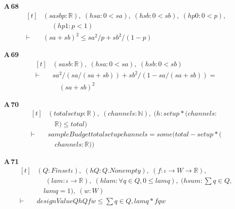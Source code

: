 \noindent\textbf{A\,68}\quad{}
{\footnotesize\[ \begin{aligned}[t]
&(\mathit{sa} \mathit{sb} \mathit{p} : \mathbb{R} ),\; (\mathit{hsa} : 0 < \mathit{sa}),\; (\mathit{hsb} : 0 < \mathit{sb}),\; (\mathit{hp0} : 0 < \mathit{p}),\\
&\quad \; (\mathit{hp1} : \mathit{p} < 1)\\
\vdash\;&(\mathit{sa} + \mathit{sb}) ^{2} \leq \mathit{sa} ^{2} / \mathit{p} + \mathit{sb} ^{2} / (1 - \mathit{p})
\end{aligned} \]}

\noindent\textbf{A\,69}\quad{}
{\footnotesize\[ \begin{aligned}[t]
&(\mathit{sa} \mathit{sb} : \mathbb{R} ),\; (\mathit{hsa} : 0 < \mathit{sa}),\; (\mathit{hsb} : 0 < \mathit{sb})\\
\vdash\;&\mathit{sa} ^{2} / (\mathit{sa} / (\mathit{sa} + \mathit{sb})) + \mathit{sb} ^{2} / (1 - \mathit{sa} / (\mathit{sa} + \mathit{sb})) =\\
&\quad (\mathit{sa} + \mathit{sb}) ^{2}
\end{aligned} \]}

\noindent\textbf{A\,70}\quad{}
{\footnotesize\[ \begin{aligned}[t]
&(\mathit{total} \mathit{setup} : \mathbb{R} ),\; (\mathit{channels} : \mathbb{N} ),\; (\mathit{h} : \mathit{setup} * (\mathit{channels} :\\
&\quad \mathbb{R} ) \leq \mathit{total})\\
\vdash\;&\mathit{sampleBudget} \mathit{total} \mathit{setup} \mathit{channels} = \mathit{some} (\mathit{total} - \mathit{setup} * (\\
&\quad \mathit{channels} : \mathbb{R} ))
\end{aligned} \]}

\noindent\textbf{A\,71}\quad{}
{\footnotesize\[ \begin{aligned}[t]
&(\mathit{Q} : \mathit{Finset} \iota ),\; (\mathit{hQ} : \mathit{Q}.\mathit{Nonempty}),\; (\mathit{f} : \iota \to \mathit{W} \to \mathbb{R} ),\\
&\quad \; (\mathit{lam} : \iota \to \mathbb{R} ),\; (\mathit{hlam} : \forall \mathit{q} \in \mathit{Q}, 0 \leq \mathit{lam} \mathit{q}),\; (\mathit{hsum} : \textstyle\sum \mathit{q} \in \mathit{Q},\\
&\quad \mathit{lam} \mathit{q} = 1),\; (\mathit{w} : \mathit{W})\\
\vdash\;&\mathit{designValue} \mathit{Q} \mathit{hQ} \mathit{f} \mathit{w} \leq \textstyle\sum \mathit{q} \in \mathit{Q}, \mathit{lam} \mathit{q} * \mathit{f} \mathit{q} \mathit{w}
\end{aligned} \]}

